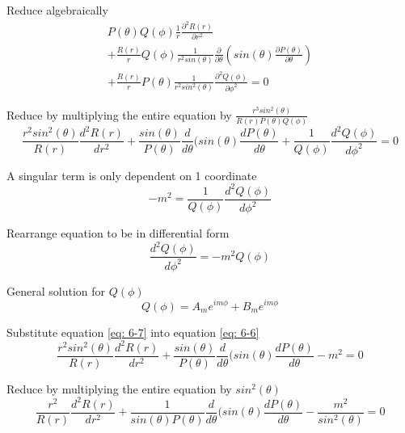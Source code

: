 \documentclass[English]{article}
\begin{document}
    Reduce algebraically
    \begin{gather*}
        P(\theta)Q(\phi) \frac{1}{r} \frac{\partial^2 R(r)}{\partial r^2} 
        \\ + \frac{R(r)}{r} Q(\phi) \frac{1}{r^2 sin(\theta)} \frac{\partial}{\partial \theta} (sin(\theta) \frac{\partial P(\theta)}{\partial \theta}) 
        \\ + \frac{R(r)}{r} P(\theta) \frac{1}{r^2 sin^2(\theta)} \frac{\partial^2 Q(\phi)}{\partial \phi^2} = 0
    \end{gather*}

    Reduce by multiplying the entire equation by $\frac{r^3 sin^2(\theta)}{R(r)P(\theta)Q(\phi)}$
    \begin{equation} \label{eq: 6-6}
        \frac{r^2sin^2(\theta)}{R(r)} \frac{d^2 R(r)}{dr^2} + \frac{sin(\theta)}{P(\theta)} \frac{d}{d \theta} (sin(\theta) \frac{d P(\theta)}{d \theta} + \frac{1}{Q(\phi)} \frac{d^2 Q(\phi)}{d \phi^2} = 0
    \end{equation}

    A singular term is only dependent on 1 coordinate
    \begin{equation} \label{eq: 6-7}
        -m^2 = \frac{1}{Q(\phi)} \frac{d^2 Q(\phi)}{d \phi^2}
    \end{equation}

    Rearrange equation to be in differential form
    \begin{equation} \label{eq: 6-8}
        \frac{d^2 Q(\phi)}{d \phi^2} = -m^2 Q(\phi)
    \end{equation}

    General solution for $Q(\phi)$
    \begin{equation} \label{eq: 6-9}
        Q(\phi) = A_m e^{im\phi} + B_m e^{im\phi}
    \end{equation}

    Substitute equation \ref{eq: 6-7} into equation \ref{eq: 6-6}
    \begin{equation} \label{eq: 6-10}
        \frac{r^2sin^2(\theta)}{R(r)} \frac{d^2 R(r)}{dr^2} + \frac{sin(\theta)}{P(\theta)} \frac{d}{d \theta} (sin(\theta) \frac{d P(\theta)}{d \theta} -m^2 = 0
    \end{equation}

    Reduce by multiplying the entire equation by $sin^2(\theta)$
    \begin{equation} \label{eq: 6-11}
        \frac{r^2}{R(r)} \frac{d^2 R(r)}{dr^2} + \frac{1}{sin(\theta) P(\theta)} \frac{d}{d \theta} (sin(\theta) \frac{d P(\theta)}{d \theta} - \frac{m^2}{sin^2(\theta)} = 0
    \end{equation}
\end{document}
